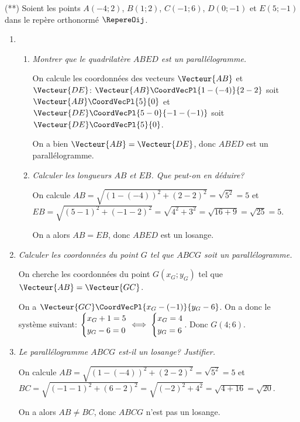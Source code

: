 \documentclass[a4paper]{article}
\begin{document}
\begin{exercice}{(**)}{}
Soient les points $A(-4;2)$, $B(1;2)$, $C(-1;6)$, $D(0;-1)$ et $E(5;-1)$ dans le repère orthonormé $\RepereOij$.
  \begin{enumerate}
    \item \begin{enumerate}
      \item \textit{Montrer que le quadrilatère $ABED$ est un parallélogramme.}
    
      On calcule les coordonnées des vecteurs $\Vecteur{AB}$ et $\Vecteur{DE}$: $\Vecteur{AB}\CoordVecPl{1-(-4)}{2-2}$ soit $\Vecteur{AB}\CoordVecPl{5}{0}$ et $\Vecteur{DE}\CoordVecPl{5-0}{-1-(-1)}$ soit $\Vecteur{DE}\CoordVecPl{5}{0}$.

      On a bien $\Vecteur{AB}=\Vecteur{DE}$, donc $ABED$ est un parallélogramme.

      \item \textit{Calculer les longueurs $AB$ et $EB$. Que peut-on en déduire?}
      
      On calcule $AB=\sqrt{(1-(-4))^2+(2-2)^2}=\sqrt{5^2}=5$ et $EB=\sqrt{(5-1)^2+(-1-2)^2}=\sqrt{4^2+3^2}=\sqrt{16+9}=\sqrt{25}=5$.

      On a alors $AB=EB$, donc $ABED$ est un losange.

    \end{enumerate}
    \item \textit{Calculer les coordonnées du point $G$ tel que $ABCG$ soit un parallélogramme.}
 
    On cherche les coordonnées du point $G(x_G;y_G)$ tel que $\Vecteur{AB}=\Vecteur{GC}$.

    On a $\Vecteur{GC}\CoordVecPl{x_G-(-1)}{y_G-6}$. On a donc le système suivant:
    $\begin{dcases}
      x_G+1=5\\
      y_G-6=0
    \end{dcases} \iff \begin{dcases}
      x_G=4\\
      y_G=6
    \end{dcases}$. Donc $G(4;6)$.

  
    \item \textit{Le parallélogramme $ABCG$ est-il un losange? Justifier.}
    
    On calcule $AB=\sqrt{(1-(-4))^2+(2-2)^2}=\sqrt{5^2}=5$ et $BC=\sqrt{(-1-1)^2+(6-2)^2}=\sqrt{(-2)^2+4^2}=\sqrt{4+16}=\sqrt{20}$.

    On a alors $AB\neq BC$, donc $ABCG$ n'est pas un losange.
  \end{enumerate}
\end{exercice}
\end{document}
